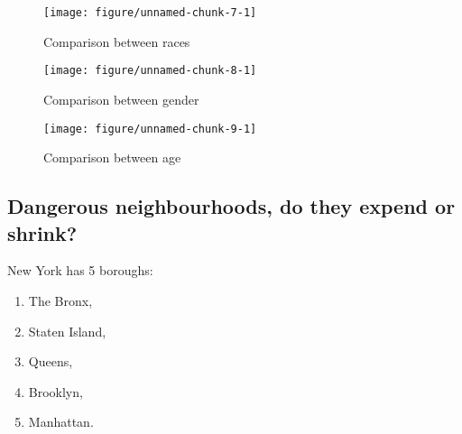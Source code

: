 \documentclass{article}\usepackage[]{graphicx}\usepackage[]{color}
\makeatletter
\def\maxwidth{ %
  \ifdim\Gin@nat@width>\linewidth
    \linewidth
  \else
    \Gin@nat@width
  \fi
}
\newenvironment{knitrout}{}{} %
\makeatother
\begin{document}
  \newpage
    \begin{figure}[hbtp]
      \caption{Comparison between races}
\begin{knitrout}
\color{fgcolor}
\texttt{[image: figure/unnamed-chunk-7-1]} 

\end{knitrout}
    \end{figure}
            
    \begin{figure}[hbtp]
      \caption{Comparison between gender}
\begin{knitrout}
\color{fgcolor}
\texttt{[image: figure/unnamed-chunk-8-1]} 

\end{knitrout}
    \end{figure}
          
    \begin{figure}[hbtp]
      \caption{Comparison  between age}
\begin{knitrout}
\color{fgcolor}
\texttt{[image: figure/unnamed-chunk-9-1]} 

\end{knitrout}
    \end{figure}

  \maketitle
    \newpage
      \subsection{Dangerous neighbourhoods, do they expend or shrink?}
        New York has 5 boroughs:
          \begin{enumerate}
            \item
              The Bronx,
            \item
            	Staten Island,
            \item
            	Queens,
            \item
            	Brooklyn,
            \item
              Manhattan. 
          \end{enumerate}
              
\end{document}
